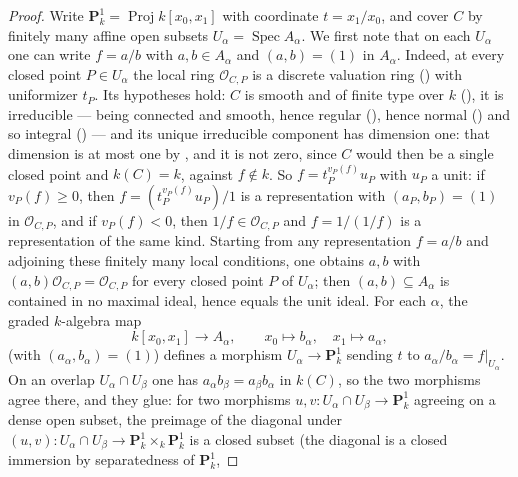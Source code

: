 \begin{proof}
Write \(\mathbf P^1_k=\operatorname{Proj}k[x_0,x_1]\) with
coordinate \(t=x_1/x_0\), and cover \(C\) by finitely many affine
open subsets \(U_\alpha=\operatorname{Spec}A_\alpha\).  We first
note that on each \(U_\alpha\) one can write \(f=a/b\) with
\(a,b\in A_\alpha\) and \((a,b)=(1)\) in \(A_\alpha\).  Indeed, at
every closed point \(P\in U_\alpha\) the local ring
\(\mathcal O_{C,P}\) is a discrete valuation ring
() with uniformizer \(t_P\).
Its hypotheses hold: \(C\) is smooth and of finite type over \(k\)
(), it is irreducible --- being connected and
smooth, hence regular (), hence normal
() and so integral
() --- and its unique
irreducible component has dimension one: that dimension is at most one
by , and it is not zero, since \(C\) would then
be a single closed point and \(k(C)=k\), against \(f\notin k\).
So \(f=t_P^{v_P(f)}u_P\) with
\(u_P\) a unit: if \(v_P(f)\geq0\),
then \(f=(t_P^{v_P(f)}u_P)/1\) is a representation with
\((a_P,b_P)=(1)\) in \(\mathcal O_{C,P}\), and if \(v_P(f)<0\),
then \(1/f\in\mathcal O_{C,P}\) and \(f=1/(1/f)\) is a
representation of the same kind.  Starting from any representation
\(f=a/b\) and adjoining these finitely many local conditions, one
obtains \(a,b\) with
\((a,b)\mathcal O_{C,P}=\mathcal O_{C,P}\) for every closed point
\(P\) of \(U_\alpha\); then \((a,b)\subseteq A_\alpha\) is
contained in no maximal ideal, hence equals the unit ideal.  For
each \(\alpha\), the graded \(k\)-algebra map
\[
 k[x_0,x_1]\longrightarrow A_\alpha,\qquad
 x_0\longmapsto b_\alpha,\quad x_1\longmapsto a_\alpha,
\]
(with \((a_\alpha,b_\alpha)=(1)\)) defines a morphism
\(U_\alpha\to\mathbf P^1_k\) sending \(t\) to
\(a_\alpha/b_\alpha=f|_{U_\alpha}\).  On an overlap
\(U_\alpha\cap U_\beta\) one has
\(a_\alpha b_\beta=a_\beta b_\alpha\) in \(k(C)\), so the two
morphisms agree there, and they glue: for two morphisms
\(u,v:U_\alpha\cap U_\beta\to\mathbf P^1_k\) agreeing on a dense
open subset, the preimage of the diagonal under
\((u,v):U_\alpha\cap U_\beta\to\mathbf
P^1_k\times_k\mathbf P^1_k\) is a closed subset (the diagonal is a
closed immersion by separatedness of \(\mathbf P^1_k\),

\end{proof}
